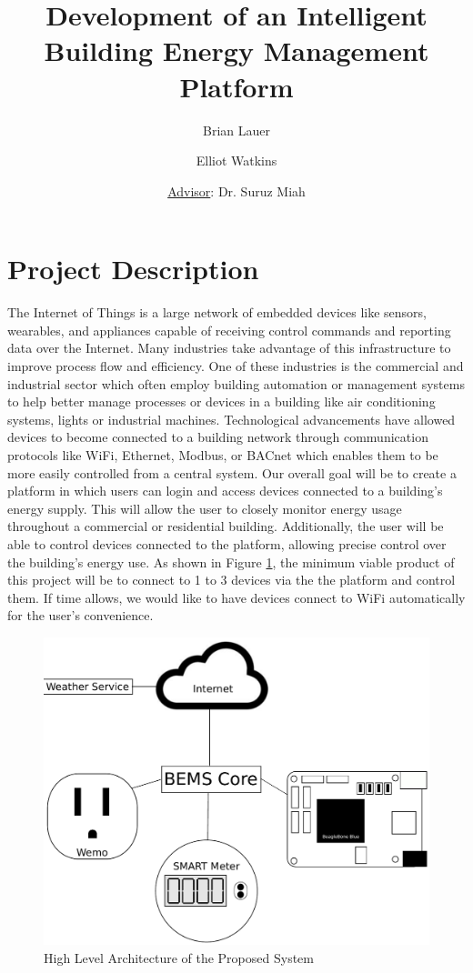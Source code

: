 \documentclass[12pt]{article} %
\title{Development of an Intelligent Building Energy Management Platform}
\author{Brian Lauer \and Elliot Watkins \and \underline{Advisor}: Dr. Suruz Miah
}
\begin{document}
\maketitle


\section{Project Description}
The Internet of Things is a large network of embedded devices like sensors, wearables, and appliances capable of receiving control commands and reporting data over the Internet. Many industries take advantage of this infrastructure to improve process flow and efficiency. One of these industries is the commercial and industrial sector which often employ building automation or management systems to help better manage processes or devices in a building like air conditioning systems, lights or industrial machines. Technological advancements have allowed devices to become connected to a building network through communication protocols like WiFi, Ethernet, Modbus, or BACnet which enables them to be more easily controlled from a central system.
\medbreak\noindent
Our overall goal will be to create a platform in which users can login and access devices connected to a building's energy supply. This will allow the user to closely monitor energy usage throughout a commercial or residential building. Additionally, the user will be able to control devices connected to the platform, allowing precise control over the building's energy use.
\medbreak\noindent
As shown in Figure \ref{fig:highLevelArchitecture}, the minimum viable product of this project will be to connect to 1 to 3 devices via the the platform and control them. If time allows, we would like to have devices connect to WiFi automatically for the user's convenience.

\begin{figure}[H]
    \centering
    \includegraphics[scale=0.35]{figs/highLevelArchitecture.pdf}
    \caption{High Level Architecture of the Proposed System}
    \label{fig:highLevelArchitecture}
\end{figure}
\end{document}
